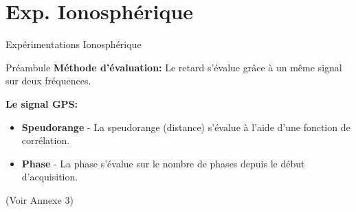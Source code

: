 \documentclass[xcolor=dvipsnames,envcountsect]{beamer}
\begin{document}
\section{Exp. Ionosphérique}
\begin{frame}
	\centering
	\begin{block}
		\scshape
		\begin{center}
			\Huge Expérimentations Ionosphérique
		\end{center}
	\end{block}
\end{frame}
\begin{frame}{Préambule}
        \textbf{Méthode d'évaluation:} 
		Le retard s'évalue grâce à un même signal sur deux fréquences.

        \textbf{Le signal GPS:} 
	    \begin{itemize}
            \item \textbf{Speudorange} - La speudorange (distance) s'évalue à l'aide d'une fonction de corrélation.
            \item \textbf{Phase} - La phase s'évalue sur le nombre de phases depuis le début d'acquisition.
        \end{itemize}
		\begin{flushright}
			\tiny{(Voir Annexe 3)}
		\end{flushright}
\end{frame}
\end{document}
